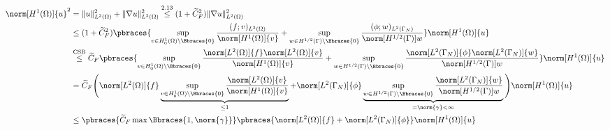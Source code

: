 \begin{solution}
\begin{enumerate}[label = (\roman*)]
    \begin{align*}
        \norm[H^1(\Omega)]{u}^2
        &= \|u\|_{L^2(\Omega)}^2 + \|\nabla u\|_{L^2(\Omega)}^2
         \stackrel{\text{2.13}}{\leq}
        (1 + \widetilde{C}_F^2)\|\nabla u\|_{L^2(\Omega)}^2 \\
        &\leq
        (1 + \widetilde{C}_F^2)
        \pbraces
        {
            \sup_{v \in H_0^1(\Omega) \setminus \Bbraces{0}}
            \frac
            {
                (f; v)_{L^2(\Omega)}
            }{
                \norm[H^1(\Omega)]{v}
            }
            +
            \sup_{w \in H^{1/2}(\Gamma) \setminus \Bbraces{0}}
            \frac
            {
                (\phi; w)_{L^2(\Gamma_N)}
            }{
                \norm[H^{1/2}(\Gamma)]{w}
            }
        } \norm[H^1(\Omega)]{u} \\
        & \stackrel{\text{CSB}}{\leq}
        \widetilde{C}_F
        \pbraces
        {
            \sup_{v \in H_0^1(\Omega) \setminus \Bbraces{0}}
            \frac
            {
                \norm[L^2(\Omega)]{f}
                \norm[L^2(\Omega)]{v}
            }{
                \norm[H^1(\Omega)]{v}
            }
            +
            \sup_{w \in H^{1/2}(\Gamma) \setminus \Bbraces{0}}
            \frac
            {
                \norm[L^2(\Gamma_N)]{\phi}
                \norm[L^2(\Gamma_N)]{w}
            }{
                \norm[H^{1/2}(\Gamma)]{w}
            }
        } \norm[H^1(\Omega)]{u}\\
        & =
        \widetilde{C}_F
        \Bigg (
            \norm[L^2(\Omega)]{f}
            \underbrace
            {
                \sup_{v \in H_0^1(\Omega) \setminus \Bbraces{0}}
                \frac
                {
                    \norm[L^2(\Omega)]{v}
                }{
                    \norm[H^1(\Omega)]{v}
                }
            }_{
                \leq 1
            }
            +
            \norm[L^2(\Gamma_N)]{\phi}
            \underbrace
            {
                \sup_{w \in H^{1/2}(\Gamma) \setminus \Bbraces{0}}
                \frac
                {
                    \norm[L^2(\Gamma_N)]{w}
                }{
                    \norm[H^{1/2}(\Gamma)]{w}
                }
            }_{
                =
                \norm{\gamma}
                <
                \infty
            }
        \Bigg ) \norm[H^1(\Omega)]{u}\\
        & \leq
        \pbraces
        {
            \widetilde{C}_F
            \max \Bbraces{1, \norm{\gamma}}
        }
        \pbraces
        {
            \norm[L^2(\Omega)]{f}
            +
            \norm[L^2(\Gamma_N)]{\phi}
        }\norm[H^1(\Omega)]{u}
    \end{align*}


\end{enumerate}
\end{solution}
